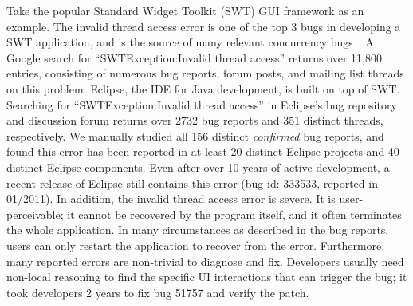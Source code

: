 Take the popular Standard Widget Toolkit (SWT) GUI framework as an example. 
The invalid thread access error is one of the top 3 bugs in developing a SWT application, and is
the source of many relevant concurrency bugs~\cite{top3bugs}.
A Google search for ``SWTException:Invalid thread access''  returns over 11,800 entries,
consisting of numerous bug reports, forum posts, and mailing list threads on
this problem. Eclipse, the IDE for Java development, is built on top of SWT\@.
Searching for ``SWTException:Invalid thread access'' in Eclipse's bug repository
and discussion forum returns over 2732 bug reports and 351 distinct threads, respectively. 
We manually studied all 156 distinct \textit{confirmed} bug reports, and 
found this error has been reported in at least 20 distinct Eclipse projects
and 40 distinct Eclipse components. Even after over 10 years of active development,
a recent release of Eclipse still contains this error (bug id: 333533, reported in 01/2011).
 In addition, the invalid thread access error
is severe. It is user-perceivable; it cannot be recovered by the program itself,
and it often terminates the whole application. In many circumstances as described in the bug reports,
users can only restart the application to recover from the error.
Furthermore, many reported  errors are non-trivial to diagnose and fix.
Developers usually need non-local reasoning to find the specific
UI interactions that can trigger the bug;  it took developers 2 years
to fix bug 51757 and verify the patch.

